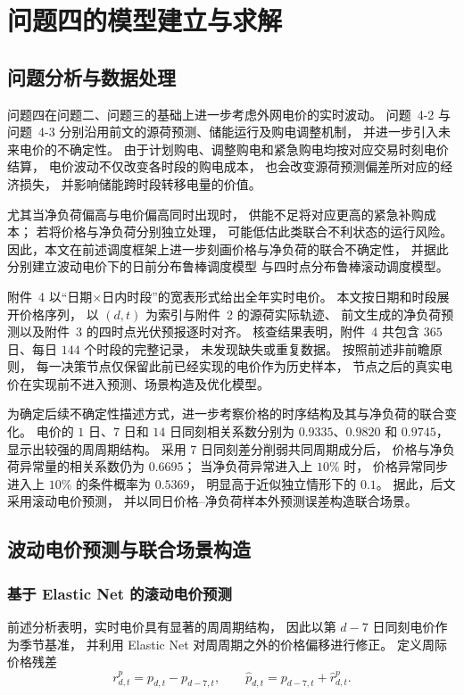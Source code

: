 \documentclass[zihao=-4,a4paper,UTF8,fontset=none]{ctexart}
\begin{document}
\section{问题四的模型建立与求解}
\subsection{问题分析与数据处理}
问题四在问题二、问题三的基础上进一步考虑外网电价的实时波动。
问题~4-2 与问题~4-3 分别沿用前文的源荷预测、储能运行及购电调整机制，
并进一步引入未来电价的不确定性。
由于计划购电、调整购电和紧急购电均按对应交易时刻电价结算，
电价波动不仅改变各时段的购电成本，
也会改变源荷预测偏差所对应的经济损失，
并影响储能跨时段转移电量的价值。

尤其当净负荷偏高与电价偏高同时出现时，
供能不足将对应更高的紧急补购成本；
若将价格与净负荷分别独立处理，
可能低估此类联合不利状态的运行风险。
因此，本文在前述调度框架上进一步刻画价格与净负荷的联合不确定性，
并据此分别建立波动电价下的日前分布鲁棒调度模型
与四时点分布鲁棒滚动调度模型。

附件~4 以“日期$\times$日内时段”的宽表形式给出全年实时电价。
本文按日期和时段展开价格序列，
以 $(d,t)$ 为索引与附件~2 的源荷实际轨迹、
前文生成的净负荷预测以及附件~3 的四时点光伏预报逐时对齐。
核查结果表明，附件~4 共包含 $365$ 日、每日 $144$ 个时段的完整记录，
未发现缺失或重复数据。
按照前述非前瞻原则，
每一决策节点仅保留此前已经实现的电价作为历史样本，
节点之后的真实电价在实现前不进入预测、场景构造及优化模型。

为确定后续不确定性描述方式，进一步考察价格的时序结构及其与净负荷的联合变化。
电价的 $1$ 日、$7$ 日和 $14$ 日同刻相关系数分别为
$0.9335$、$0.9820$ 和 $0.9745$，
显示出较强的周周期结构。
采用 $7$ 日同刻差分削弱共同周期成分后，
价格与净负荷异常量的相关系数仍为 $0.6695$；
当净负荷异常进入上 $10\%$ 时，
价格异常同步进入上 $10\%$ 的条件概率为 $0.5369$，
明显高于近似独立情形下的 $0.1$。
据此，后文采用滚动电价预测，
并以同日价格--净负荷样本外预测误差构造联合场景。

\subsection{波动电价预测与联合场景构造}
\subsubsection{基于 Elastic Net 的滚动电价预测}

前述分析表明，实时电价具有显著的周周期结构，
因此以第 $d-7$ 日同刻电价作为季节基准，
并利用 Elastic Net 对周周期之外的价格偏移进行修正。
定义周际价格残差
\begin{equation}
    r_{d,t}^{p}
    =
    p_{d,t}-p_{d-7,t},
    \qquad
    \widehat p_{d,t}
    =
    p_{d-7,t}
    +
    \widehat r_{d,t}^{p}.
    \label{eq:q4_price_residual}
\end{equation}
\end{document}
